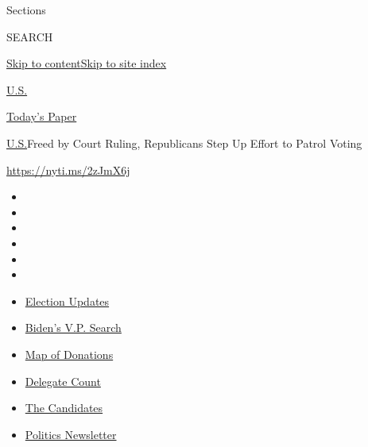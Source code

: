 Sections

SEARCH

\protect\hyperlink{site-content}{Skip to
content}\protect\hyperlink{site-index}{Skip to site index}

\href{https://www.nytimes.com/section/us}{U.S.}

\href{https://myaccount.nytimes.com/auth/login?response_type=cookie\&client_id=vi}{}

\href{https://www.nytimes.com/section/todayspaper}{Today's Paper}

\href{/section/us}{U.S.}\textbar{}Freed by Court Ruling, Republicans
Step Up Effort to Patrol Voting

\url{https://nyti.ms/2zJmX6j}

\begin{itemize}
\item
\item
\item
\item
\item
\item
\end{itemize}

\begin{itemize}
\item
  \href{https://www.nytimes.com/2020/08/04/us/elections/primary-election-michigan-arizona-kansas.html?action=click\&pgtype=Article\&state=default\&region=TOP_BANNER\&context=storylines_menu}{Election
  Updates}
\item
  \href{https://www.nytimes.com/article/biden-vice-president-2020.html?action=click\&pgtype=Article\&state=default\&region=TOP_BANNER\&context=storylines_menu}{Biden's
  V.P. Search}
\item
  \href{https://www.nytimes.com/interactive/2020/07/24/us/politics/trump-biden-campaign-donors.html?action=click\&pgtype=Article\&state=default\&region=TOP_BANNER\&context=storylines_menu}{Map
  of Donations}
\item
  \href{https://www.nytimes.com/interactive/2020/us/elections/delegate-count-primary-results.html?action=click\&pgtype=Article\&state=default\&region=TOP_BANNER\&context=storylines_menu}{Delegate
  Count}
\item
  \href{https://www.nytimes.com/interactive/2019/us/politics/2020-presidential-candidates.html?action=click\&pgtype=Article\&state=default\&region=TOP_BANNER\&context=storylines_menu}{The
  Candidates}
\item
  \href{https://www.nytimes.com/newsletters/politics?action=click\&pgtype=Article\&state=default\&region=TOP_BANNER\&context=storylines_menu}{Politics
  Newsletter}
\end{itemize}

